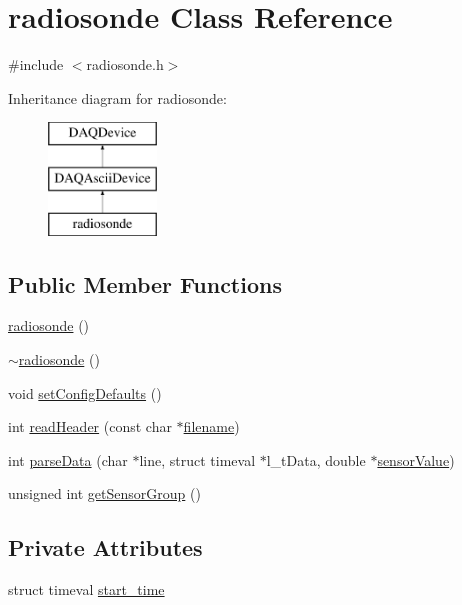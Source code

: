 \hypertarget{classradiosonde}{\section{radiosonde Class Reference}
\label{classradiosonde}
}


{\ttfamily \#include $<$radiosonde.\-h$>$}

Inheritance diagram for radiosonde\-:\begin{figure}[H]
\begin{center}
\leavevmode
\includegraphics[height=3.000000cm]{classradiosonde}
\end{center}
\end{figure}
\subsection*{Public Member Functions}
\begin{DoxyCompactItemize}
\item 
\hyperlink{classradiosonde_aeee339fb1fefca43181050022a115950}{radiosonde} ()
\item 
\hyperlink{classradiosonde_a215f03d8d6d94f97989770f703549dc7}{$\sim$radiosonde} ()
\item 
void \hyperlink{classradiosonde_a8c1c1be9e950d6c3b70df6bc13f8cbca}{set\-Config\-Defaults} ()
\item 
int \hyperlink{classradiosonde_ad8974221a2a65698387b7c6552f6903a}{read\-Header} (const char $\ast$\hyperlink{classDAQDevice_a7f9cda7cf5b41f6b134c313477e9644b}{filename})
\item 
int \hyperlink{classradiosonde_af31298e5aa292b7d8113116ae112db01}{parse\-Data} (char $\ast$line, struct timeval $\ast$l\-\_\-t\-Data, double $\ast$\hyperlink{classDAQDevice_ad148188c57598fdf4fd4c1c333aeb0d8}{sensor\-Value})
\item 
unsigned int \hyperlink{classradiosonde_ad7e2421821dca49851d8fc8c5f9f3177}{get\-Sensor\-Group} ()
\end{DoxyCompactItemize}
\subsection*{Private Attributes}
\begin{DoxyCompactItemize}
\item 
struct timeval \hyperlink{classradiosonde_a3a7487275417bf085aed3f7e8bb9efdd}{start\-\_\-time}
\end{DoxyCompactItemize}
